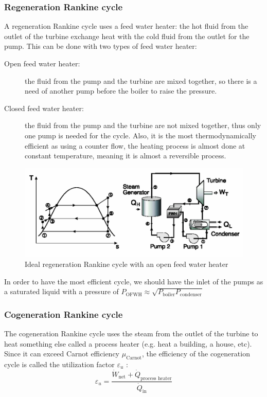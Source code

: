 \documentclass[10pt, twocolumn]{article}
\begin{document}
\subsubsection{Regeneration Rankine cycle}
A regeneration Rankine cycle uses a feed water heater: the hot fluid from the outlet of the turbine exchange heat with the cold fluid from the outlet for the pump.
This can be done with two types of feed water heater:
\begin{description}
  \item[Open feed water heater:] the fluid from the pump and the turbine are mixed together, so there is a need of another pump before the boiler to raise the pressure.
  \item[Closed feed water heater:] the fluid from the pump and the turbine are not mixed together, thus only one pump is needed for the cycle.
        Also, it is the most thermodynamically efficient as using a counter flow, the heating process is almost done at constant temperature, meaning it is almost a reversible process.
\end{description}

\begin{figure}[ht] %
  \centering
  \caption{Ideal regeneration Rankine cycle with an open feed water heater}
  \label{fig:ideal-rgeneration-Rankine-OFWH}
  \includegraphics[width = 0.9\linewidth]{../../images/mech/mech-351/ideal-regeneration-Rankine-cycle-OFWH.png}
\end{figure}

In order to have the most efficient cycle, we should have the inlet of the pumps as a saturated liquid with a pressure of \(P_\text{OFWH} \approx \sqrt{P_\mathrm{boiler} P_\mathrm{condenser}}\)

\subsubsection{Cogeneration Rankine cycle}
The cogeneration Rankine cycle uses the steam from the outlet of the turbine to heat something else called a process heater (e.g. heat a building, a house, etc).
Since it can exceed Carnot efficiency \(\mu_\mathrm{Carnot}\), the efficiency of the cogeneration cycle is called the utilization factor \(\varepsilon_u\) :
\[
  \varepsilon_u = \frac{\dot{W}_\mathrm{net} + \dot{Q}_\text{process heater}}{\dot{Q}_\mathrm{in}}
\]
\end{document}
